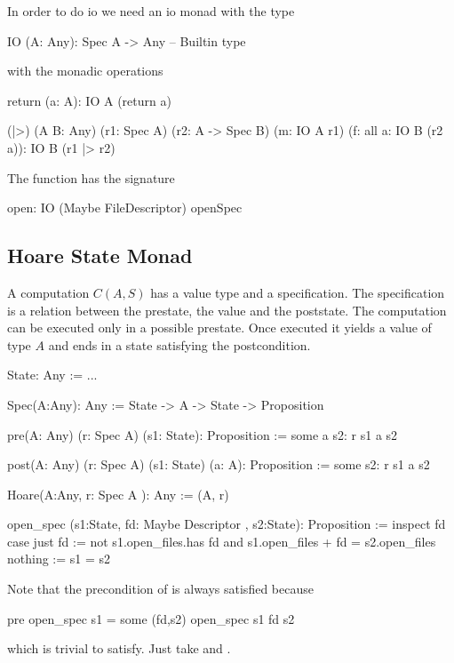 In order to do io we need an io monad with the type
\begin{alba}
    IO (A: Any): Spec A -> Any  -- Builtin type
\end{alba}
%
with the monadic operations
\begin{alba}
    return (a: A): IO A (return a)

    (|>)
        (A B: Any)
        (r1: Spec A)
        (r2: A -> Spec B)
        (m: IO A r1)
        (f: all a: IO B (r2 a)):
        IO B (r1 |> r2)
\end{alba}




The  function has the signature
%
\begin{alba}
    open: IO (Maybe FileDescriptor) openSpec
\end{alba}



\begin{alba}
\end{alba}






\subsection{Hoare State Monad}

A computation $C(A,S)$ has a value type and a specification. The specification
is a relation between the prestate, the value and the poststate. The
computation can be executed only in a possible prestate. Once executed it
yields a value of type $A$ and ends in a state satisfying the postcondition.

\begin{alba}
  State: Any := ...

  Spec(A:Any): Any :=
    State -> A -> State -> Proposition

  pre(A: Any) (r: Spec A)  (s1: State): Proposition :=
    some a s2: r s1 a s2

  post(A: Any) (r: Spec A) (s1: State) (a: A): Proposition :=
    some s2: r s1 a s2


  Hoare(A:Any, r: Spec A ): Any := (A, r)

  open_spec (s1:State, fd: Maybe Descriptor , s2:State): Proposition :=
    inspect fd case
      just fd  :=
        not s1.open_files.has fd
        and
        s1.open_files + fd = s2.open_files
      nothing :=
        s1 = s2
\end{alba}
Note that the precondition of  is always satisfied because
%
\begin{alba}
   pre open_spec s1  = some (fd,s2) open_spec s1 fd s2
\end{alba}
%
which is trivial to satisfy. Just take  and .

